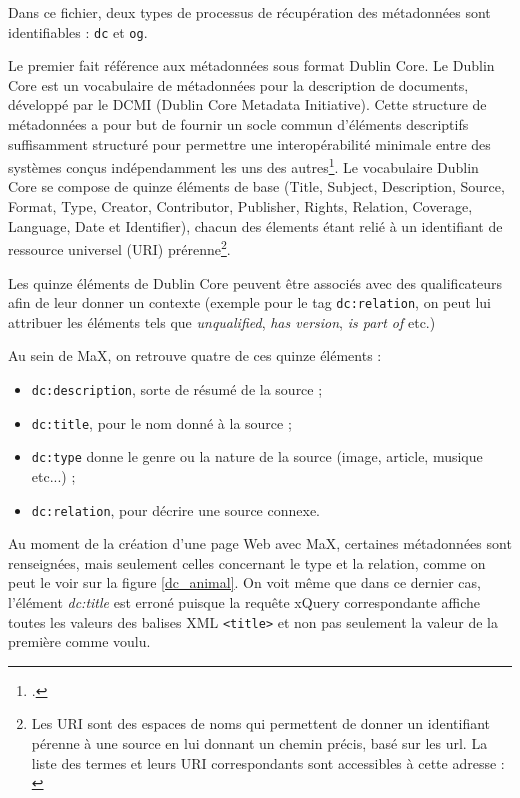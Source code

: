 \documentclass[a4paper,12pt,twoside]{book}
\begin{document}
Dans ce fichier, deux types de processus de récupération des métadonnées sont identifiables : \texttt{dc}  et \texttt{og}.

Le premier fait référence aux métadonnées sous format Dublin Core. Le Dublin Core est un vocabulaire de métadonnées pour la  description de documents, développé par le DCMI (Dublin Core Metadata Initiative). Cette structure de métadonnées a pour but de \og fournir un socle commun d'éléments descriptifs suffisamment structuré pour permettre une interopérabilité minimale entre des systèmes conçus indépendamment les uns des autres\footcite{dublincore}\fg. Le vocabulaire Dublin Core se compose de quinze éléments de base (Title, Subject, Description, Source, Format, Type, Creator, Contributor, Publisher, Rights, Relation, Coverage, Language, Date et Identifier), chacun des élements étant relié à un identifiant de ressource universel (URI) prérenne\footnote{Les URI sont des espaces de noms qui permettent de donner un identifiant pérenne à une source en lui donnant un chemin précis, basé sur les url. La liste des termes et leurs URI correspondants sont accessibles à cette adresse : \cite{dcmi}}.


Les quinze éléments de Dublin Core peuvent être associés avec des qualificateurs afin de leur donner un contexte (exemple pour le tag \texttt{dc:relation}, on peut lui attribuer les éléments tels que \textit{unqualified}, \textit{has version}, \textit{is part of} etc.)


Au sein de MaX, on retrouve quatre de ces quinze éléments :

\begin{itemize}
    \item \texttt{dc:description}, sorte de résumé de la source ;
    \item \texttt{dc:title}, pour le nom donné à la source ;
    \item \texttt{dc:type} donne le genre ou la nature de la source (image, article, musique etc...) ;
    \item \texttt{dc:relation}, pour décrire une source connexe.
\end{itemize}

Au moment de la création d'une page Web avec MaX, certaines métadonnées sont renseignées, mais seulement celles concernant le type et la relation, comme on peut le voir sur la figure \ref{dc_animal}. On voit même que dans ce dernier cas, l'élément \textit{dc:title} est erroné puisque la requête xQuery correspondante affiche toutes les valeurs des balises XML \texttt{<title>} et non pas seulement la valeur de la première comme voulu.
\end{document}
